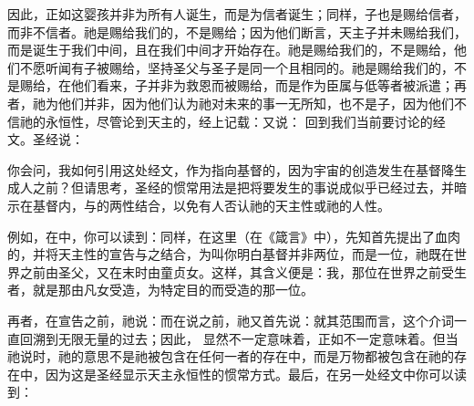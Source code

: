 因此，正如这婴孩并非为所有人诞生，而是为信者诞生；同样，子也是赐给信者，而非不信者。祂是赐给我们的，不是赐给；因为他们断言，天主子并未赐给我们，而是诞生于我们中间，且在我们中间才开始存在。祂是赐给我们的，不是赐给，他们不愿听闻有子被赐给，坚持圣父与圣子是同一个且相同的。祂是赐给我们的，不是赐给，在他们看来，子并非为救恩而被赐给，而是作为臣属与低等者被派遣；再者，祂为他们并非，因为他们认为祂对未来的事一无所知，也不是子，因为他们不信祂的永恒性，尽管论到天主的，经上记载：又说： 回到我们当前要讨论的经文。圣经说：\par

\par

你会问，我如何引用这处经文，作为指向基督的，因为宇宙的创造发生在基督降生成人之前？但请思考，圣经的惯常用法是把将要发生的事说成似乎已经过去，并暗示在基督内，与的两性结合，以免有人否认祂的天主性或祂的人性。\par

例如，在中，你可以读到：同样，在这里（在《箴言》中），先知首先提出了血肉的，并将天主性的宣告与之结合，为叫你明白基督并非两位，而是一位，祂既在世界之前由圣父，又在末时由童贞女。这样，其含义便是：我，那位在世界之前受生者，就是那由凡女受造，为特定目的而受造的那一位。\par

再者，在宣告之前，祂说：而在说之前，祂又首先说：就其范围而言，这个介词一直回溯到无限无量的过去；因此， 显然不一定意味着，正如不一定意味着。但当祂说时，祂的意思不是祂被包含在任何一者的存在中，而是万物都被包含在祂的存在中，因为这是圣经显示天主永恒性的惯常方式。最后，在另一处经文中你可以读到：\par

